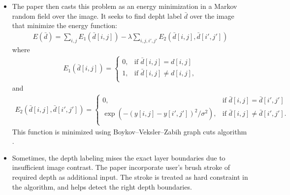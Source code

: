 \documentclass[10pt]{article}
\begin{document}
\begin{itemize}
  \item The paper then casts this problem as an energy minimization in a Markov random field over the image. It seeks to find depht label $\bar{d}$ over the image that minimize the energy function:
  \begin{align*}
    E(\bar{d}) = \sum_{i,j} E_1(\bar{d}[i,j]) - \lambda \sum_{i,j,i',j'} E_2(\bar{d}[i,j], \bar{d}[i',j'])
  \end{align*}
  where
  \begin{align*}
    E_1(\bar{d}[i,j]) = \begin{cases}
      0, & \mbox{if } \bar{d}[i,j] = d[i,j]\\
      1, & \mbox{if } \bar{d}[i,j] \neq d[i,j],\\
    \end{cases}
  \end{align*}
  and
  \begin{align*}
    E_2(\bar{d}[i,j], \bar{d}[i',j']) = \begin{cases}
      0, & \mbox{if } \bar{d}[i,j] = \bar{d}[i',j']\\
      \exp(-(y[i,j] - y[i',j'])^2/\sigma^2), & \mbox{if } \bar{d}[i,j] \neq \bar{d}[i',j'].\\
    \end{cases}
  \end{align*}
  This function is minimized using Boykov--Veksler--Zabih graph cuts algorithm \cite{Boykov:2001}.
  
  \item Sometimes, the depth labeling mises the exact layer boundaries due to insufficient image contrast. The paper incorporate user's brush stroke of required depth as additional input. The stroke is treated as hard constraint in the algorithm, and helps detect the right depth boundaries.
  
\end{itemize}
  

	
\end{document}
